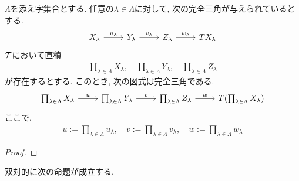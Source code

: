 \documentclass[uplatex, a4paper, 14Q, dvipdfmx]{jsarticle}
\begin{document}
\begin{theorem} \label{preserve_prod}
  $\Lambda$を添え字集合とする. 
  任意の$\lambda \in \Lambda$に対して, 次の完全三角が与えられているとする. 
  \[\begin{tikzcd}
    {X_\lambda} & {Y_\lambda} & {Z_\lambda} & {TX_\lambda}
    \arrow["{u_\lambda}", from=1-1, to=1-2]
    \arrow["{v_\lambda}", from=1-2, to=1-3]
    \arrow["{w_\lambda}", from=1-3, to=1-4]
  \end{tikzcd}\]
  $\mathcal{T}$において直積
  \begin{align*}
    \prod_{\lambda \in \Lambda} X_\lambda, \quad
    \prod_{\lambda \in \Lambda} Y_\lambda, \quad
    \prod_{\lambda \in \Lambda} Z_\lambda
  \end{align*}
  が存在するとする. 
  このとき, 次の図式は完全三角である. 
  \[\begin{tikzcd}
    {\prod_{\lambda \in \Lambda} X_\lambda} & {\prod_{\lambda \in \Lambda} Y_\lambda} & {\prod_{\lambda \in \Lambda} Z_\lambda} & {T(\prod_{\lambda \in \Lambda} X_\lambda)}
    \arrow["{u}", from=1-1, to=1-2]
    \arrow["{v}", from=1-2, to=1-3]
    \arrow["{w}", from=1-3, to=1-4]
  \end{tikzcd}\]
  ここで, 
  \begin{align*}
    u:= \prod_{\lambda \in \Lambda} u_\lambda, \quad
    v:= \prod_{\lambda \in \Lambda} v_\lambda, \quad
    w:= \prod_{\lambda \in \Lambda} w_\lambda
  \end{align*}
\end{theorem}

\begin{proof}
  
\end{proof}

双対的に次の命題が成立する. 
\end{document}
